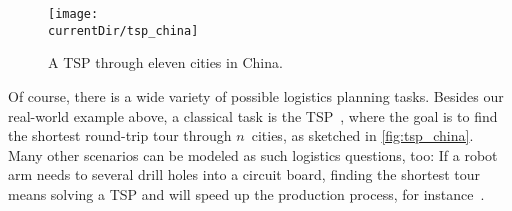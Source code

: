\begin{figure}%
\centering%
\texttt{[image: \\currentDir/tsp\_china]}%
\caption{A \acrfull{TSP} through eleven cities in China.}%
\label{fig:tsp_china}%
\end{figure}%
%
Of course, there is a wide variety of possible logistics planning tasks.
Besides our real-world example above, a classical task is the \acrfull{TSP}~\cite{ABCC2006TTSPACS,LLRKS1985TTSPAGTOCO,GP2002TTSPAIV}, where the goal is to find the shortest round-trip tour through $n$~cities, as sketched in \autoref{fig:tsp_china}.
Many other scenarios can be modeled as such logistics questions, too:
If a robot arm needs to several drill holes into a circuit board, finding the shortest tour means solving a \gls{TSP} and will speed up the production process, for instance~\cite{GJR1991OCOPADMACS}.%
\endhsection%
%
